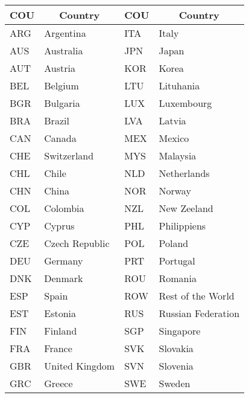 \begin{table}[H]
\footnotesize
\centering\caption{ISO 3 Alpha Code}
{
\def\sym#1{\ifmmode^{#1}\else\(^{#1}\)\fi}
\begin{longtable}{l*{1}{l}l*{1}{l}}
\toprule\endfirsthead\midrule\endhead\midrule\endfoot\endlastfoot
  COU             &\multicolumn{1}{c}{Country} &COU             &\multicolumn{1}{c}{Country}\\
\midrule
ARG             &     Argentina& ITA             &     Italy\\
AUS             &     Australia& JPN             &     Japan\\
AUT             &     Austria& KOR             &     Korea\\
BEL             &     Belgium& LTU             &     Lituhania\\
BGR             &     Bulgaria&LUX             &     Luxembourg\\
BRA             &     Brazil& LVA             &     Latvia\\
CAN             &     Canada& MEX             &     Mexico\\
CHE             &     Switzerland& MYS             &     Malaysia\\
CHL             &     Chile& NLD             &     Netherlands\\
CHN             &    China& NOR             &     Norway\\
COL             &     Colombia&  NZL             &     New Zeeland\\
CYP             &     Cyprus& PHL             &     Philippiens\\
CZE             &     Czech Republic& POL             &     Poland \\
DEU             &     Germany& PRT             &     Portugal\\
DNK             &     Denmark& ROU             &     Romania\\
ESP             &     Spain&  ROW             &     Rest of the World\\
EST             &     Estonia& RUS             &     Russian Federation\\
FIN             &     Finland& SGP             &     Singapore\\
FRA             &     France&  SVK             &     Slovakia\\
GBR             &     United Kingdom& SVN             &  Slovenia\\
GRC             &     Greece& SWE             &     Sweden\\

\end{longtable}}
\end{table}
